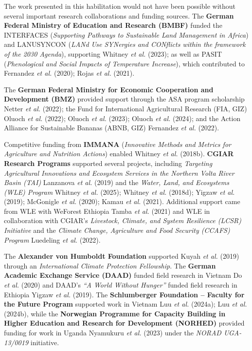 \documentclass[
]{article}
\begin{document}
The work presented in this habilitation would not have been possible
without several important research collaborations and funding sources.
The \textbf{German Federal Ministry of Education and Research (BMBF)}
funded the INTERFACES (\emph{Supporting Pathways to Sustainable Land
Management in Africa}) and LANUSYNCON (\emph{LANd Use SYNergies and
CONflicts within the framework of the 2030 Agenda}), supporting Whitney
\emph{et al.} (2023); as well as PASIT (\emph{Phenological and Social
Impacts of Temperature Increase}), which contributed to Fernandez
\emph{et al.} (2020); Rojas \emph{et al.} (2021).

The \textbf{German Federal Ministry for Economic Cooperation and
Development (BMZ)} provided support through the ASA program scholarship
Netter \emph{et al.} (2022); the Fund for International Agricultural
Research (FIA, GIZ) Oluoch \emph{et al.} (2022); Oluoch \emph{et al.}
(2023); Oluoch \emph{et al.} (2024); and the Action Alliance for
Sustainable Bananas (ABNB, GIZ) Fernandez \emph{et al.} (2022).

Competitive funding from \textbf{IMMANA} (\emph{Innovative Methods and
Metrics for Agriculture and Nutrition Actions}) enabled Whitney \emph{et
al.} (2018b). \textbf{CGIAR Research Programs} supported several
projects, including \emph{Targeting Agricultural Innovations and
Ecosystem Services in the Northern Volta River Basin (TAI)} Lanzanova
\emph{et al.} (2019) and the \emph{Water, Land, and Ecosystems (WLE)
Program} Whitney \emph{et al.} (2025); Whitney \emph{et al.} (2018d);
Yigzaw \emph{et al.} (2019); McGonigle \emph{et al.} (2020); Kamau
\emph{et al.} (2021). Additional support came from WLE with WeForest
Ethiopia Tamba \emph{et al.} (2021) and WLE in collaboration with
CGIAR's \emph{Livestock, Climate, and System Resilience (LCSR)
Initiative} and the \emph{Climate Change, Agriculture and Food Security
(CCAFS) Program} Luedeling \emph{et al.} (2022).

The \textbf{Alexander von Humboldt Foundation} supported Kuyah \emph{et
al.} (2019) through an \emph{International Climate Protection
Fellowship}. The \textbf{German Academic Exchange Service (DAAD)} funded
field research in Vietnam Do \emph{et al.} (2020) and DAAD's \emph{``A
World Without Hunger''} funded field research in Ethiopia Yigzaw
\emph{et al.} (2019). The \textbf{Schlumberger Foundation -- Faculty for
the Future Program} supported work in Vietnam Luu \emph{et al.} (2024a);
Luu \emph{et al.} (2024b), while the \textbf{Norwegian Programme for
Capacity Building in Higher Education and Research for Development
(NORHED)} provided funding for work in Uganda Nyamukuru \emph{et al.}
(2023) under the \emph{NORAD UGA-13/0019} initiative.
\end{document}
